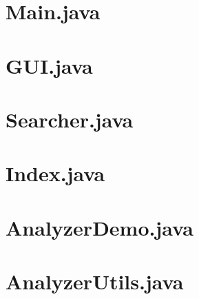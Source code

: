 \documentclass[12pt,a4paper,ngerman]{report}
\begin{document}
\begin{appendices} 
\chapter{Main.java}

\chapter{GUI.java}

\chapter{Searcher.java}

\chapter{Index.java}

\chapter{AnalyzerDemo.java}

\chapter{AnalyzerUtils.java}

\end{appendices}
\end{document}
